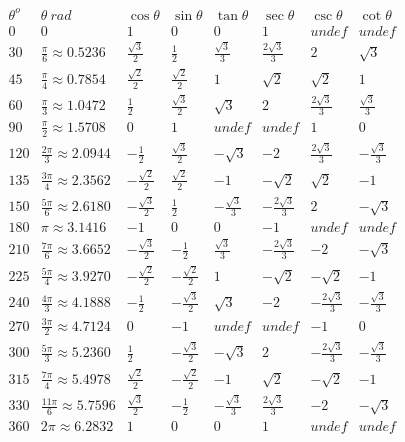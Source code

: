 \documentclass[11pt]{article}
\begin{document}
\(\begin{matrix}
{\theta^{o}} & {\theta\ {rad}} & {\cos\theta} & {\sin\theta} & {\tan\theta} & {\sec\theta} & {\csc\theta} & {\cot\theta} \\
0 & 0 & 1 & 0 & 0 & 1 & {undef} & {undef} \\
30 & {\frac{\pi}{6} \approx 0.5236} & \frac{\sqrt{3}}{2} & \frac{1}{2} & \frac{\sqrt{3}}{3} & \frac{2\sqrt{3}}{3} & 2 & \sqrt{3} \\
45 & {\frac{\pi}{4} \approx 0.7854} & \frac{\sqrt{2}}{2} & \frac{\sqrt{2}}{2} & 1 & \sqrt{2} & \sqrt{2} & 1 \\
60 & {\frac{\pi}{3} \approx 1.0472} & \frac{1}{2} & \frac{\sqrt{3}}{2} & \sqrt{3} & 2 & \frac{2\sqrt{3}}{3} & \frac{\sqrt{3}}{3} \\
90 & {\frac{\pi}{2} \approx 1.5708} & 0 & 1 & {undef} & {undef} & 1 & 0 \\
120 & {\frac{2\pi}{3} \approx 2.0944} & {- \frac{1}{2}} & \frac{\sqrt{3}}{2} & {- \sqrt{3}} & {- 2} & \frac{2\sqrt{3}}{3} & {- \frac{\sqrt{3}}{3}} \\
135 & {\frac{3\pi}{4} \approx 2.3562} & {- \frac{\sqrt{2}}{2}} & \frac{\sqrt{2}}{2} & {- 1} & {- \sqrt{2}} & \sqrt{2} & {- 1} \\
150 & {\frac{5\pi}{6} \approx 2.6180} & {- \frac{\sqrt{3}}{2}} & \frac{1}{2} & {- \frac{\sqrt{3}}{3}} & {- \frac{2\sqrt{3}}{3}} & 2 & {- \sqrt{3}} \\
180 & {\pi \approx 3.1416} & {- 1} & 0 & 0 & {- 1} & {undef} & {undef} \\
210 & {\frac{7\pi}{6} \approx 3.6652} & {- \frac{\sqrt{3}}{2}} & {- \frac{1}{2}} & \frac{\sqrt{3}}{3} & {- \frac{2\sqrt{3}}{3}} & {- 2} & {- \sqrt{3}} \\
225 & {\frac{5\pi}{4} \approx 3.9270} & {- \frac{\sqrt{2}}{2}} & {- \frac{\sqrt{2}}{2}} & 1 & {- \sqrt{2}} & {- \sqrt{2}} & {- 1} \\
240 & {\frac{4\pi}{3} \approx 4.1888} & {- \frac{1}{2}} & {- \frac{\sqrt{3}}{2}} & \sqrt{3} & {- 2} & {- \frac{2\sqrt{3}}{3}} & {- \frac{\sqrt{3}}{3}} \\
270 & {\frac{3\pi}{2} \approx 4.7124} & 0 & {- 1} & {undef} & {undef} & {- 1} & 0 \\
300 & {\frac{5\pi}{3} \approx 5.2360} & \frac{1}{2} & {- \frac{\sqrt{3}}{2}} & {- \sqrt{3}} & 2 & {- \frac{2\sqrt{3}}{3}} & {- \frac{\sqrt{3}}{3}} \\
315 & {\frac{7\pi}{4} \approx 5.4978} & \frac{\sqrt{2}}{2} & {- \frac{\sqrt{2}}{2}} & {- 1} & \sqrt{2} & {- \sqrt{2}} & {- 1} \\
330 & {\frac{11\pi}{6} \approx 5.7596} & \frac{\sqrt{3}}{2} & {- \frac{1}{2}} & {- \frac{\sqrt{3}}{3}} & \frac{2\sqrt{3}}{3} & {- 2} & {- \sqrt{3}} \\
360 & {2\pi \approx 6.2832} & 1 & 0 & 0 & 1 & {undef} & {undef} \\
\end{matrix}\)
\end{document}
